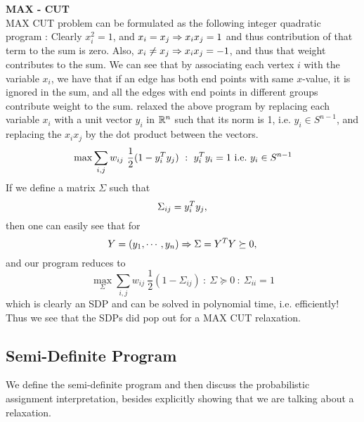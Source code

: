 \begin{example}{\bf MAX - CUT}\label{maxcut}\\
MAX CUT problem can be formulated as the following integer quadratic program : 
Clearly $x_i^2=1$, and $x_i=x_j\Rightarrow x_ix_j=1$ and thus contribution of that term to the sum is zero. 
Also, $x_i \neq x_j \Rightarrow x_ix_j=-1$, and thus that weight contributes to the sum. 
We can see that by associating each vertex $i$ with the variable $x_i$, we have that if an edge has both end points with same $x$-value, it is ignored in the sum, and all the edges with end points in different groups contribute weight to the sum. 
\cite{delormecombinatorial} relaxed the above program by replacing each variable $x_i$ with a unit vector $y_i$ in $\mathbb{R}^n$ such that its norm is 1, i.e. $y_i \in S^{n-1}$, and replacing the $x_ix_j$ by the dot product between the vectors. 
\[ \max \sum_{i,j} w_{ij} \ \frac{1}{2}(1-y_i^T y_j) ~:~ y_i^T y_i = 1 {\mbox {\ i.e.\ }} y_i \in S^{n-1} \]
If we define a matrix $\Sigma$ such that $$\Sigma_{ij} = y_i^T y_j,$$ then one can easily see that for $$Y = (y_1, \cdots, y_n) \Rightarrow \Sigma = Y^T Y \succeq 0,$$ and our program reduces to 
\[ \max_\Sigma \sum_{i,j} w_{ij} \ \frac{1}{2}(1-\Sigma_{ij}) ~:~ \Sigma \succeq 0 ~:~ \Sigma_{ii} = 1  \]
which is clearly an SDP and can be solved in polynomial time, i.e. efficiently! 
Thus we see that the SDPs did pop out for a MAX CUT relaxation.
\end{example}

\subsection{Semi-Definite Program}
We define the semi-definite program and then discuss the probabilistic assignment interpretation, besides explicitly showing that we are talking about a relaxation.

